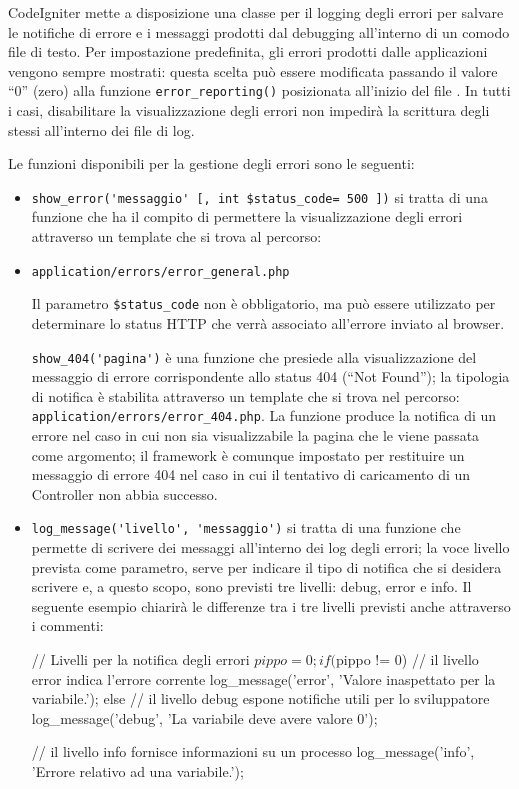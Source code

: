 CodeIgniter mette a disposizione una classe per il logging degli errori per salvare le notifiche di errore e i messaggi prodotti dal debugging all'interno di un comodo file di testo. Per impostazione predefinita, gli errori prodotti dalle applicazioni vengono sempre mostrati: questa scelta può essere modificata passando il valore ``0'' (zero) alla funzione \verb|error_reporting()| posizionata all'inizio del file . In tutti i casi, disabilitare la visualizzazione degli errori non impedirà la scrittura degli stessi all'interno dei file di log.

Le funzioni disponibili per la gestione degli errori sono le seguenti:

\begin{itemize}
\item \verb|show_error('messaggio' [, int $status_code= 500 ])| si tratta di una funzione che ha il compito di permettere la visualizzazione degli errori attraverso un template che si trova al percorso:

\item \verb|application/errors/error_general.php|

Il parametro \verb|$status_code| non è obbligatorio, ma può essere utilizzato per determinare lo status \ac{HTTP} che verrà associato all'errore inviato al browser.

\verb|show_404('pagina')| è una funzione che presiede alla visualizzazione del messaggio di errore corrispondente allo status 404 (``Not Found''); la tipologia di notifica è stabilita attraverso un template che si trova nel percorso: \verb|application/errors/error_404.php|. La funzione produce la notifica di un errore nel caso in cui non sia visualizzabile la pagina che le viene passata come argomento; il framework è comunque impostato per restituire un messaggio di errore 404 nel caso in cui il tentativo di caricamento di un Controller non abbia successo.

\item \verb|log_message('livello', 'messaggio')| si tratta di una funzione che permette di scrivere dei messaggi all'interno dei log degli errori; la voce livello prevista come parametro, serve per indicare il tipo di notifica che si desidera scrivere e, a questo scopo, sono previsti tre livelli: debug, error e info. Il seguente esempio chiarirà le differenze tra i tre livelli previsti anche attraverso i commenti:

\begin{code}
// Livelli per la notifica degli errori
$pippo = 0; 
if ($pippo != 0)
{
  // il livello error indica l'errore corrente
  log_message('error', 'Valore inaspettato per la variabile.');
}
else
{
  // il livello debug espone notifiche utili per lo sviluppatore 
  log_message('debug', 'La variabile deve avere valore 0');
}

// il livello info fornisce informazioni su un processo
log_message('info', 'Errore relativo ad una variabile.');
\end{code}

\end{itemize}

